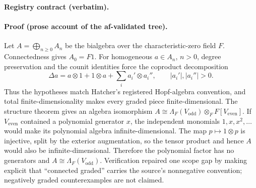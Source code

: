 \noindent\textbf{Registry contract (verbatim).}

\paragraph{Proof (prose account of the af-validated tree).}
Let $A=\bigoplus_{n\ge0}A_n$ be the bialgebra over the characteristic-zero field $F$.
Connectedness gives $A_0=F1$.  For homogeneous $a\in A_n$, $n>0$, degree preservation
and the counit identities force the coproduct decomposition
\[
  \Delta a=a\otimes1+1\otimes a+\sum_i a_i'\otimes a_i'',
  \qquad |a_i'|,|a_i''|>0.
\]
Thus the hypotheses match Hatcher's registered Hopf-algebra convention, and total
finite-dimensionality makes every graded piece finite-dimensional.  The structure
theorem gives an algebra isomorphism
$A\cong\Lambda_F(V_{\mathrm{odd}})\otimes_F F[V_{\mathrm{even}}]$.
If $V_{\mathrm{even}}$ contained a polynomial generator $x$, the independent monomials
$1,x,x^2,\ldots$ would make its polynomial algebra infinite-dimensional.  The map
$p\mapsto1\otimes p$ is injective, split by the exterior augmentation, so the tensor
product and hence $A$ would also be infinite-dimensional.  Therefore the polynomial
factor has no generators and $A\cong\Lambda_F(V_{\mathrm{odd}})$.  Verification
repaired one scope gap by making explicit that ``connected graded'' carries the
source's nonnegative convention; negatively graded counterexamples are not claimed.
